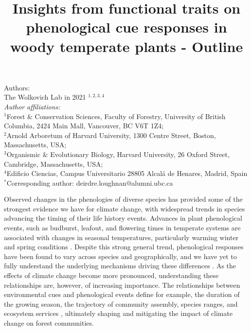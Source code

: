 \documentclass{article}\usepackage[]{graphicx}\usepackage[]{color}
\title{Insights from functional traits on phenological cue responses in woody temperate plants - Outline}
\begin{document}
\maketitle

\noindent Authors:\\
The Wolkovich Lab in 2021 $^{1,2,3,4}$
\vspace{2ex}\\
\emph{Author affiliations:}\\
$^{1}$Forest \& Conservation Sciences, Faculty of Forestry, University of British Columbia, 2424 Main Mall, Vancouver, BC V6T 1Z4;\\
$^{2}$Arnold Arboretum of Harvard University, 1300 Centre Street, Boston, Massachusetts, USA;\\
$^{3}$Organismic \& Evolutionary Biology, Harvard University, 26 Oxford Street, Cambridge, Massachusetts, USA;\\
$^{4}$Edificio Ciencias, Campus Universitario 28805 Alcalá de Henares, Madrid, Spain\\
 

\vspace{2ex}
$^*$Corresponding author: deirdre.loughnan@alumni.ubc.ca\\
\renewcommand{\thetable}{\arabic{table}}
\renewcommand{\thefigure}{\arabic{figure}}
\renewcommand{\labelitemi}{$-$}

Observed changes in the phenologies of diverse species has provided some of the strongest evidence we have for climate change, with widespread trends in species advancing the timing of their life history events. Advances in plant phenological events, such as budburst, leafout, and flowering times in temperate systems are associated with changes in seasonal temperatures, particularly warming winter and spring conditions \citep{MillerRushing2008, Menzel2006, Fitter2002b}. Despite this strong general trend, phenological responses have been found to vary across species and geographically, and we have yet to fully understand the underlying mechanisms driving these differences \citep{Chuine2010, Morin2009}. As the effects of climate change become more pronounced, understanding these relationships are, however, of increasing importance. The relationships between environmental cues and phenological events define for example, the duration of the growing season, the trajectory of community assembly, species ranges, and ecosystem services \citep{White1997, Chuine2010, Cleland2007}, ultimately shaping and mitigating the impact of climate change on forest communities.
\end{document}
